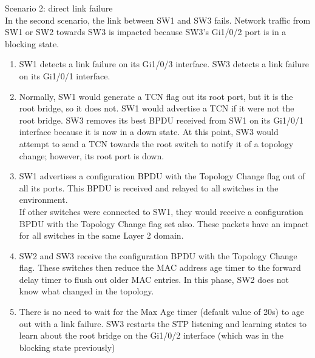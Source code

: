 \documentclass{article}
\begin{document}
	Scenario 2: direct link failure\\
		In the second scenario, the link between SW1 and SW3 fails. Network traffic from SW1 or SW2 towards SW3 is impacted because SW3's Gi1/0/2 port is in a blocking state.	
		\begin{enumerate}
			\item SW1 detects a link failure on its Gi1/0/3 interface. SW3 detects a link failure on its Gi1/0/1 interface.
			\item Normally, SW1 would generate a TCN flag out its root port, but it is the root bridge, so it does not. SW1 would advertise a TCN if it were not the root bridge.
				SW3 removes its best BPDU received from SW1 on its Gi1/0/1 interface because it is now in a down state. At this point, SW3 would attempt to send a TCN towards the root switch to notify it of a topology change; however, its root port is down.
			\item SW1 advertises a configuration BPDU with the Topology Change flag out of all its ports. This BPDU is received and relayed to all switches in the environment.\\
				If other switches were connected to SW1, they would receive a configuration BPDU with the Topology Change flag set also. These packets have an impact for all switches in the same Layer 2 domain.
			\item SW2 and SW3 receive the configuration BPDU with the Topology Change flag. These switches then reduce the MAC address age timer to the forward delay timer to flush out older MAC entries. In this phase, SW2 does not know what changed in the topology.
			\item There is no need to wait for the Max Age timer (default value of 20s) to age out with a link failure. SW3 restarts the STP listening and learning states to learn about the root bridge on the Gi1/0/2 interface (which was in the blocking state previously)
		\end{enumerate}
\end{document}
